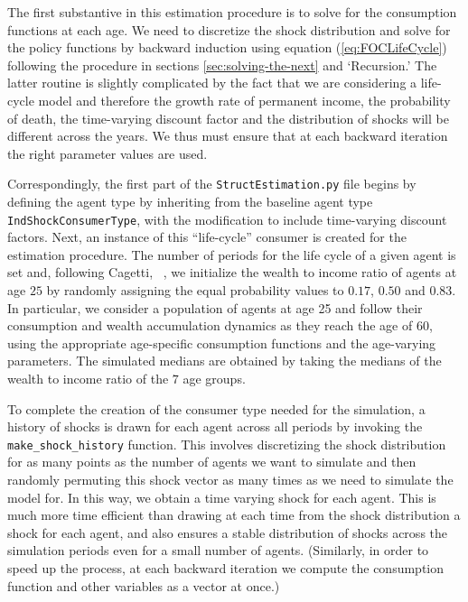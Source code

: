 \documentclass[titlepage, headings=optiontotocandhead]{econark}
\begin{document}
{The first substantive {\prch} in this estimation procedure is
to solve for the consumption functions at each age. We need to
discretize the shock distribution and solve for the policy
functions by backward induction using equation (\ref{eq:FOCLifeCycle})
following the procedure in sections \ref{sec:solving-the-next} and
`Recursion.' The latter routine
is slightly complicated by the fact that we are considering a
life-cycle model and therefore the growth rate of permanent income,
the probability of death, the time-varying discount factor and the
distribution of shocks will be different across the years. We thus
must ensure that at each backward iteration the right parameter
values are used.

Correspondingly, the first part of the \texttt{StructEstimation.py} file begins by defining the agent type by inheriting from the baseline agent type \texttt{IndShockConsumerType}, with the modification to include time-varying discount factors. Next, an instance of this ``life-cycle'' consumer is created for the estimation procedure.  The number of periods for the life cycle of a given agent is set and, following Cagetti, ~\citeyearpar{cagettiWprofiles}, we initialize the wealth to income ratio of agents at age $25$ by randomly assigning the equal probability values to $0.17$, $0.50$ and $0.83$. In particular, we consider a population of agents at age 25 and follow their consumption and wealth accumulation dynamics as they reach the age of $60$, using the appropriate age-specific consumption functions and the age-varying parameters. The simulated medians are obtained by taking the medians of the wealth to income ratio of the $7$ age groups.

To complete the creation of the consumer type needed for the simulation, a history of shocks is drawn for each agent across all periods by invoking the \texttt{make\_shock\_history} function. This involves discretizing the shock distribution for as many points as the number of agents we want to simulate and then randomly permuting this shock vector as many times as we need to simulate the model for. In this way, we obtain a time varying shock for each agent. This is much more time efficient than drawing at each time from the shock distribution a shock for each agent, and also ensures a stable distribution of shocks across the simulation periods even for a small number of agents. (Similarly, in order to speed up the process, at each backward iteration we compute the consumption function and other variables as a vector at once.)

}
\end{document}

